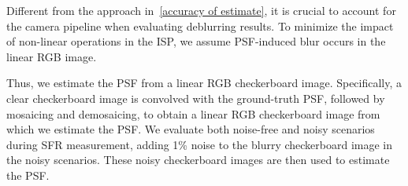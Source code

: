 \begin{table}[b]
\vspace{1mm}
  \caption{ Quantitative evaluations (PSNR/SSIM) using the imaging system (Edmund Lens \#63762 and onsemi AR1820HS sensor). }
  \vspace{-2mm}
  \hspace{-5mm}
\scriptsize
\renewcommand{\arraystretch}{1.3}
\centering
{}
\end{table}




Different from the approach in~\cref{accuracy of estimate}, it is crucial to account for the camera pipeline when evaluating deblurring results. To minimize the impact of non-linear operations in the ISP, we assume PSF-induced blur occurs in the linear RGB image.

Thus, we estimate the PSF from a linear RGB checkerboard image. Specifically, a clear checkerboard image is convolved with the ground-truth PSF, followed by mosaicing and demosaicing, to obtain a linear RGB checkerboard image from which we estimate the PSF. We evaluate both noise-free and noisy scenarios during SFR measurement, adding 1\% noise to the blurry checkerboard image in the noisy scenarios. These noisy checkerboard images are then used to estimate the PSF.

